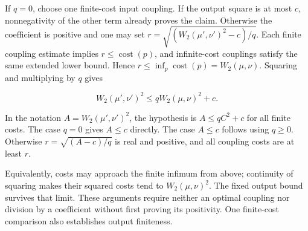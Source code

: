 \documentclass[11pt,a4paper]{report}
\begin{document}
If \(q=0\), choose one finite-cost input coupling. If the output square is at most \(c\), nonnegativity of the other term already proves the claim. Otherwise the coefficient is positive and one may set \(r=\sqrt{(W_2(\mu',\nu')^2-c)/q}\). Each finite coupling estimate implies \(r\le\operatorname{cost}(p)\), and infinite-cost couplings satisfy the same extended lower bound. Hence \(r\le\inf_p\operatorname{cost}(p)=W_2(\mu,\nu)\). Squaring and multiplying by \(q\) gives

\[W_2(\mu',\nu')^2\le qW_2(\mu,\nu)^2+c.\]

In the notation \(A=W_2(\mu',\nu')^2\), the hypothesis is \(A\le qC^2+c\) for all finite costs. The case \(q=0\) gives \(A\le c\) directly. The case \(A\le c\) follows using \(q\ge0\). Otherwise \(r=\sqrt{(A-c)/q}\) is real and positive, and all coupling costs are at least \(r\).



Equivalently, costs may approach the finite infimum from above; continuity of squaring makes their squared costs tend to \(W_2(\mu,\nu)^2\). The fixed output bound survives that limit. These arguments require neither an optimal coupling nor division by a coefficient without first proving its positivity. One finite-cost comparison also establishes output finiteness.
\end{document}
